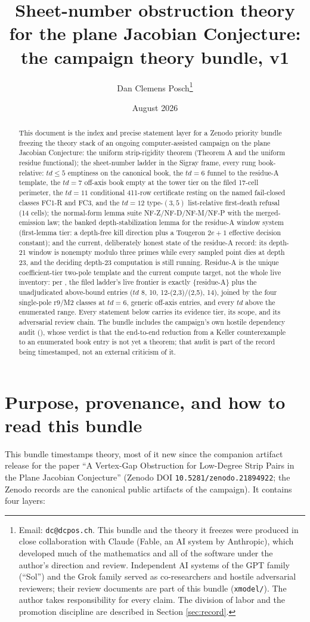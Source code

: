 \documentclass[11pt]{article}
\title{Sheet-number obstruction theory for the plane Jacobian Conjecture:\\ the campaign theory bundle, v1}
\author{Dan Clemens Posch\thanks{Email: \texttt{dc@dcpos.ch}. This bundle and the theory it freezes were produced in close collaboration with Claude (Fable, an AI system by Anthropic), which developed much of the mathematics and all of the software under the author's direction and review. Independent AI systems of the GPT family (``Sol'') and the Grok family served as co-researchers and hostile adversarial reviewers; their review documents are part of this bundle (\texttt{xmodel/}). The author takes responsibility for every claim. The division of labor and the promotion discipline are described in Section \ref{sec:record}.}}
\date{August 2026}
\theoremstyle{definition}
\theoremstyle{remark}
\begin{document}
\maketitle

\begin{abstract}
This document is the index and precise statement layer for a Zenodo priority
bundle freezing the theory stack of an ongoing computer-assisted campaign on
the plane Jacobian Conjecture: the uniform strip-rigidity theorem (Theorem A
and the uniform residue functional); the sheet-number ladder in the Sigray
frame, every rung book-relative: $td\le 5$ emptiness on the canonical book,
the $td=6$ funnel to the residue-A template, the $td=7$ off-axis book empty
at the tower tier on the filed 17-cell perimeter, the $td=11$ conditional
411-row certificate resting on the named fail-closed classes FC1-R and FC3,
and the $td=12$ type-$(3,5)$ list-relative first-death refusal (14 cells);
the normal-form lemma suite NF-Z/NF-D/NF-M/NF-P with the merged-emission
law; the banked depth-stabilization lemma for the residue-A window system
(first-lemma tier: a depth-free kill direction plus a Tougeron $2e+1$
effective decision constant); and the current, deliberately honest state of
the residue-A record: its depth-21 window is nonempty modulo three primes
while every sampled point dies at depth 23, and the deciding depth-23
computation is still running. Residue-A is the unique coefficient-tier
two-pole template and the current compute target, not the whole live
inventory: per , the filed ladder's live frontier is
exactly $\{$residue-A$\}$ plus the unadjudicated above-bound entries
($td$ 8, 10, 12-(2,3)/(2,5), 14), joined by the four single-pole r9/M2
classes at $td=6$, generic off-axis entries, and every $td$ above the
enumerated range. Every statement below carries its evidence tier, its
scope, and its adversarial review chain. The bundle includes the campaign's own
hostile dependency audit (), whose verdict is that the
end-to-end reduction from a Keller counterexample to an enumerated book entry
is not yet a theorem; that audit is part of the record being timestamped,
not an external criticism of it.
\end{abstract}

\section{Purpose, provenance, and how to read this bundle}\label{sec:purpose}

This bundle timestamps theory, most of it new since the companion artifact
release for the paper ``A Vertex-Gap Obstruction for Low-Degree Strip Pairs
in the Plane Jacobian Conjecture'' (Zenodo DOI \texttt{10.5281/zenodo.21894922};
the Zenodo records are the canonical public artifacts of the campaign). It
contains four layers:
\end{document}
